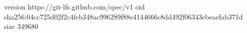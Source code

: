 version https://git-lfs.github.com/spec/v1
oid sha256:04cc725d02f2c4feb348ac996289f88e4144666c8dd492f06343ebeaefab371d
size 349680
